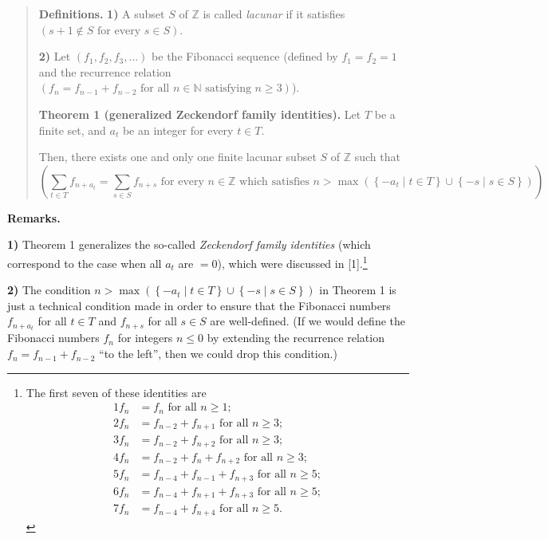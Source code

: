 \documentclass[12pt,final,notitlepage,onecolumn]{article}%
\begin{document}
\bigskip

\begin{quote}
\textbf{Definitions.} \textbf{1)} A subset $S$ of $\mathbb{Z}$ is called
\textit{lacunar} if it satisfies $\left(  s+1\notin S\text{ for every }s\in
S\right)  $.

\textbf{2)} Let $\left(  f_{1},f_{2},f_{3},...\right)  $ be the Fibonacci
sequence (defined by $f_{1}=f_{2}=1$ and the recurrence relation $\left(
f_{n}=f_{n-1}+f_{n-2}\text{ for all }n\in\mathbb{N}\text{ satisfying }%
n\geq3\right)  $).

\textbf{Theorem 1 (generalized Zeckendorf family identities).} Let $T$ be a
finite set, and $a_{t}$ be an integer for every $t\in T$.

Then, there exists one and only one finite lacunar subset $S$ of $\mathbb{Z}$
such that
\[
\left(  \sum\limits_{t\in T}f_{n+a_{t}}=\sum\limits_{s\in S}f_{n+s}\text{ for
every }n\in\mathbb{Z}\text{ which satisfies }n>\max\left(  \left\{  -a_{t}\mid
t\in T\right\}  \cup\left\{  -s\mid s\in S\right\}  \right)  \right)  .
\]



\end{quote}

\textbf{Remarks.}

\textbf{1)} Theorem 1 generalizes the so-called \textit{Zeckendorf family
identities} (which correspond to the case when all $a_{t}$ are $=0$), which
were discussed in [1].\footnote{The first seven of these identities are%
\begin{align*}
1f_{n} &  =f_{n}\text{ for all }n\geq1;\\
2f_{n} &  =f_{n-2}+f_{n+1}\text{ for all }n\geq3;\\
3f_{n} &  =f_{n-2}+f_{n+2}\text{ for all }n\geq3;\\
4f_{n} &  =f_{n-2}+f_{n}+f_{n+2}\text{ for all }n\geq3;\\
5f_{n} &  =f_{n-4}+f_{n-1}+f_{n+3}\text{ for all }n\geq5;\\
6f_{n} &  =f_{n-4}+f_{n+1}+f_{n+3}\text{ for all }n\geq5;\\
7f_{n} &  =f_{n-4}+f_{n+4}\text{ for all }n\geq5.
\end{align*}
}

\textbf{2)} The condition $n>\max\left(  \left\{  -a_{t}\mid t\in T\right\}
\cup\left\{  -s\mid s\in S\right\}  \right)  $ in Theorem 1 is just a
technical condition made in order to ensure that the Fibonacci numbers
$f_{n+a_{t}}$ for all $t\in T$ and $f_{n+s}$ for all $s\in S$ are
well-defined. (If we would define the Fibonacci numbers $f_{n}$ for integers
$n\leq0$ by extending the recurrence relation $f_{n}=f_{n-1}+f_{n-2}$ ``to the
left'', then we could drop this condition.)
\end{document}
